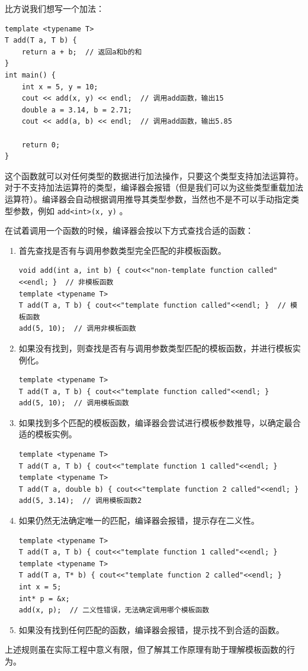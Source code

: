 比方说我们想写一个加法：
\begin{verbatim}
template <typename T>
T add(T a, T b) {
    return a + b;  // 返回a和b的和
}
int main() {
    int x = 5, y = 10;
    cout << add(x, y) << endl;  // 调用add函数，输出15
    double a = 3.14, b = 2.71;
    cout << add(a, b) << endl;  // 调用add函数，输出5.85

    return 0;
}
\end{verbatim}
这个函数就可以对任何类型的数据进行加法操作，只要这个类型支持加法运算符。对于不支持加法运算符的类型，编译器会报错（但是我们可以为这些类型重载加法运算符）。编译器会自动根据调用推导其类型参数，当然也不是不可以手动指定类型参数，例如 \texttt{add<int>(x, y)} 。

\begin{tip}
在试着调用一个函数的时候，编译器会按以下方式查找合适的函数：
\begin{enumerate}
    \item 首先查找是否有与调用参数类型完全匹配的非模板函数。
    \begin{verbatim}
void add(int a, int b) { cout<<"non-template function called"<<endl; }  // 非模板函数
template <typename T>
T add(T a, T b) { cout<<"template function called"<<endl; }  // 模板函数
add(5, 10);  // 调用非模板函数
    \end{verbatim}
    \item 如果没有找到，则查找是否有与调用参数类型匹配的模板函数，并进行模板实例化。
    \begin{verbatim}
template <typename T>
T add(T a, T b) { cout<<"template function called"<<endl; }
add(5, 10);  // 调用模板函数
    \end{verbatim}
    \item 如果找到多个匹配的模板函数，编译器会尝试进行模板参数推导，以确定最合适的模板实例。
    \begin{verbatim}
template <typename T>
T add(T a, T b) { cout<<"template function 1 called"<<endl; }
template <typename T>
T add(T a, double b) { cout<<"template function 2 called"<<endl; }
add(5, 3.14);  // 调用模板函数2
    \end{verbatim}
    \item 如果仍然无法确定唯一的匹配，编译器会报错，提示存在二义性。
    \begin{verbatim}
template <typename T>
T add(T a, T b) { cout<<"template function 1 called"<<endl; }
template <typename T>
T add(T a, T* b) { cout<<"template function 2 called"<<endl; }
int x = 5;
int* p = &x;
add(x, p);  // 二义性错误，无法确定调用哪个模板函数
    \end{verbatim}
    \item 如果没有找到任何匹配的函数，编译器会报错，提示找不到合适的函数。
\end{enumerate}

上述规则虽在实际工程中意义有限，但了解其工作原理有助于理解模板函数的行为。
\end{tip}

